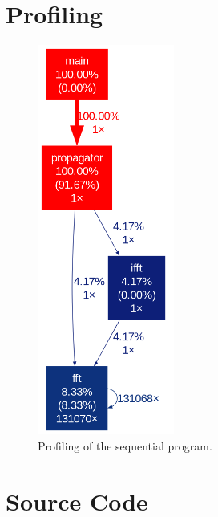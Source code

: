 \documentclass{article}
\begin{document}
\section{Profiling}
\label{sec:Profiling}
\begin{figure}[h]
    \includegraphics[width=0.4\textwidth]{figures/gprof_seq.png}
    \centering
    \caption*{Profiling of the sequential program.}
\end{figure}

\section{Source Code}
\label{sec:source}

\end{document}
